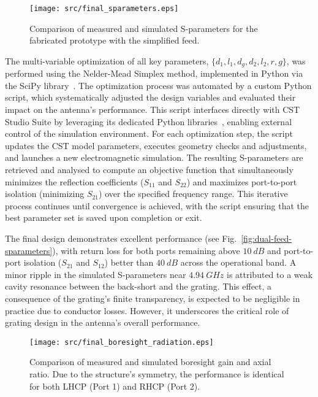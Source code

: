 \documentclass[journal,9pt]{IEEEtran}
\begin{document}
\begin{figure}[!b]
\centering
\texttt{[image: src/final\_sparameters.eps]}
\caption{\label{fig:final-sparameters}Comparison of measured and simulated S-parameters for the fabricated prototype with the simplified feed.}
\end{figure}

The multi-variable optimization of all key parameters, $\{d_1, l_1, d_g, d_2, l_2, r, g\}$, was performed using the Nelder-Mead Simplex method, implemented in Python via the SciPy library~\cite{virtanen-et-al:scipy}. The optimization process was automated by a custom Python script, which systematically adjusted the design variables and evaluated their impact on the antenna's performance. This script interfaces directly with CST Studio Suite by leveraging its dedicated Python libraries~\cite{cst:python-libraries-documentation}, enabling external control of the simulation environment. For each optimization step, the script updates the CST model parameters, executes geometry checks and adjustments, and launches a new electromagnetic simulation. The resulting S-parameters are retrieved and analysed to compute an objective function that simultaneously minimizes the reflection coefficients ($S_{11}$ and $S_{22}$) and maximizes port-to-port isolation (minimizing $S_{21}$) over the specified frequency range. This iterative process continues until convergence is achieved, with the script ensuring that the best parameter set is saved upon completion or exit.

The final design demonstrates excellent performance (see Fig.~\ref{fig:dual-feed-sparameters}), with return loss for both ports remaining above $\qty{10}{dB}$ and port-to-port isolation ($S_{21}$ and $S_{12}$) better than $\qty{40}{dB}$ across the operational band. A minor ripple in the simulated S-parameters near $\qty{4.94}{GHz}$ is attributed to a weak cavity resonance between the back-short and the grating. This effect, a consequence of the grating's finite transparency, is expected to be negligible in practice due to conductor losses. However, it underscores the critical role of grating design in the antenna's overall performance.

\begin{figure}[!b]
\centering
\texttt{[image: src/final\_boresight\_radiation.eps]}
\caption{\label{fig:final-boresight-radiation}Comparison of measured and simulated boresight gain and axial ratio. Due to the structure's symmetry, the performance is identical for both LHCP (Port 1) and RHCP (Port 2).}
\end{figure}
\end{document}
